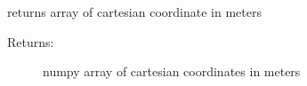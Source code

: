 \documentclass[letterpaper,10pt,english]{sphinxmanual}
\begin{document}
\begin{fulllineitems}
\begin{fulllineitems}
\begin{description}
\end{description}

\end{fulllineitems}


\begin{fulllineitems}
\label{TRIPPy:TRIPPy.beam.Ray.x}
returns array of cartesian coordinate in meters
\begin{description}
\item[{Returns:}] \leavevmode
numpy array of cartesian coordinates in meters

\end{description}

\end{fulllineitems}


\end{fulllineitems}

\end{document}
